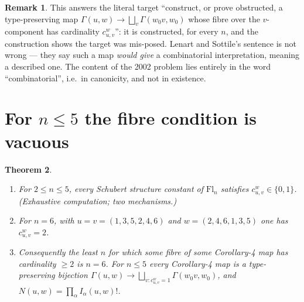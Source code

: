 \documentclass[11pt]{article}
\theoremstyle{plain}
\newtheorem{theorem}{Theorem}
\theoremstyle{definition}
\newtheorem{remark}[theorem]{Remark}
\newcommand{\Gam}{\Gamma}
\newcommand{\wo}{w_0}
\begin{document}
\begin{remark}
This answers the literal target ``construct, or prove obstructed, a
type-preserving map $\Gam(u,w)\to\bigsqcup_v\Gam(\wo v,\wo)$ whose fibre over the
$v$-component has cardinality $c^w_{u,v}$'': it is constructed, for every $n$,
and the construction shows the target was mis-posed.  Lenart and Sottile's
sentence is not wrong --- they say such a map \emph{would give} a combinatorial
interpretation, meaning a described one.  The content of the 2002 problem lies
entirely in the word ``combinatorial'', i.e.\ in canonicity, and not in
existence.
\end{remark}

\section{For $n\le5$ the fibre condition is vacuous}

\begin{theorem}\label{thm:B}
\begin{enumerate}
\item For $2\le n\le 5$, every Schubert structure constant of $\mathrm{Fl}_n$
  satisfies $c^w_{u,v}\in\{0,1\}$.  \emph{(Exhaustive computation; two
  mechanisms.)}
\item For $n=6$, with $u=v=(1,3,5,2,4,6)$ and $w=(2,4,6,1,3,5)$ one has
  $c^w_{u,v}=2$.
\item Consequently the least $n$ for which some fibre of some Corollary-4 map has
  cardinality $\ge2$ is $n=6$.  For $n\le5$ every Corollary-4 map is a
  type-preserving \emph{bijection}
  $\Gam(u,w)\to\bigsqcup_{v:c^w_{u,v}=1}\Gam(\wo v,\wo)$, and
  $N(u,w)=\prod_\alpha I_\alpha(u,w)!$.
\end{enumerate}
\end{theorem}
\end{document}
